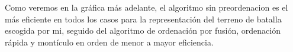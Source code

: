 Como veremos en la gráfica más adelante, el algoritmo sin preordenacion es el más eficiente en todos los casos para la representación del terreno de batalla escogida por mi, seguido del algoritmo de ordenación por fusión, ordenación rápida y montículo en orden de menor a mayor eficiencia.